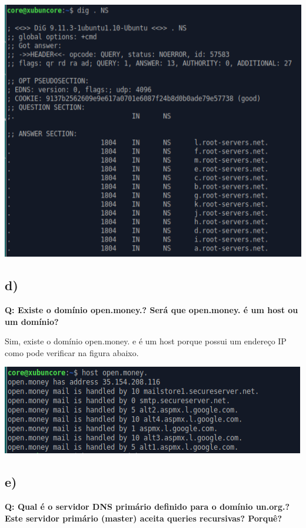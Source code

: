 \documentclass[a4paper]{article}
\begin{document}
\begin{center}
\includegraphics[scale=0.6]{images/1cRoot}
\end{center}

\subsection{ d)} \textbf{Q: Existe o domínio open.money.? Será que open.money. é um host ou um domínio?} \par

Sim, existe o domínio open.money. e é um host porque possui um endereço IP como pode verificar na figura abaixo.

\begin{center}
\includegraphics[scale=1]{images/1d}
\end{center}

\subsection{ e)} \textbf{Q: Qual  é  o  servidor DNS primário  definido para  o  domínio un.org.? Este  servidor  primário  (master)  aceita  queries  recursivas? Porquê?} \par
\end{document}
